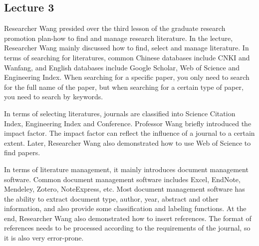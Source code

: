 \documentclass[UTF-8]{ctexart}
\begin{document}
\subsection{Lecture 3}
Researcher Wang presided over the third lesson of the graduate research promotion plan-how to find and manage research literature. In the lecture, Researcher Wang mainly discussed how to find, select and manage literature.
In terms of searching for literatures, common Chinese databases include CNKI and Wanfang, and English databases include Google Scholar, Web of Science and Engineering Index. When searching for a specific paper, you only need to search for the full name of the paper, but when searching for a certain type of paper, you need to search by keywords.

In terms of selecting literatures, journals are classified into Science Citation Index, Engineering Index and Conference. Professor Wang briefly introduced the impact factor. The impact factor can reflect the influence of a journal to a certain extent. Later, Researcher Wang also demonstrated how to use Web of Science to find papers.

In terms of literature management, it mainly introduces document management software. Common document management software includes Excel, EndNote, Mendeley, Zotero, NoteExpress, etc. Most document management software has the ability to extract document type, author, year, abstract and other information, and also provide some classification and labeling functions. At the end, Researcher Wang also demonstrated how to insert references. The format of references needs to be processed according to the requirements of the journal, so it is also very error-prone.
\end{document}
